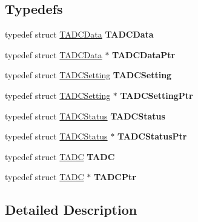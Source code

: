 \subsection*{Typedefs}
\begin{DoxyCompactItemize}
\item 
\hypertarget{group___adc_strc_gaabc053244bce68f5004ad44af7f422ac}{typedef struct \hyperlink{struct_t_a_d_c_data}{T\-A\-D\-C\-Data} {\bfseries T\-A\-D\-C\-Data}}\label{group___adc_strc_gaabc053244bce68f5004ad44af7f422ac}

\item 
\hypertarget{group___adc_strc_gad9248d597a7e144380114ef0dbe20cc5}{typedef struct \hyperlink{struct_t_a_d_c_data}{T\-A\-D\-C\-Data} $\ast$ {\bfseries T\-A\-D\-C\-Data\-Ptr}}\label{group___adc_strc_gad9248d597a7e144380114ef0dbe20cc5}

\item 
\hypertarget{group___adc_strc_gae4f02bb2c9f53335a8ca370614f74524}{typedef struct \hyperlink{struct_t_a_d_c_setting}{T\-A\-D\-C\-Setting} {\bfseries T\-A\-D\-C\-Setting}}\label{group___adc_strc_gae4f02bb2c9f53335a8ca370614f74524}

\item 
\hypertarget{group___adc_strc_ga793ae314045584a7b66afcbb2f41480e}{typedef struct \hyperlink{struct_t_a_d_c_setting}{T\-A\-D\-C\-Setting} $\ast$ {\bfseries T\-A\-D\-C\-Setting\-Ptr}}\label{group___adc_strc_ga793ae314045584a7b66afcbb2f41480e}

\item 
\hypertarget{group___adc_strc_ga1e365637ba4e56bc1cb6823d6a564e99}{typedef struct \hyperlink{struct_t_a_d_c_status}{T\-A\-D\-C\-Status} {\bfseries T\-A\-D\-C\-Status}}\label{group___adc_strc_ga1e365637ba4e56bc1cb6823d6a564e99}

\item 
\hypertarget{group___adc_strc_ga63160c4fe11be4e3f32133672b9b9c4e}{typedef struct \hyperlink{struct_t_a_d_c_status}{T\-A\-D\-C\-Status} $\ast$ {\bfseries T\-A\-D\-C\-Status\-Ptr}}\label{group___adc_strc_ga63160c4fe11be4e3f32133672b9b9c4e}

\item 
\hypertarget{group___adc_strc_ga28e28b6703a05705bfd982018c266202}{typedef struct \hyperlink{struct_t_a_d_c}{T\-A\-D\-C} {\bfseries T\-A\-D\-C}}\label{group___adc_strc_ga28e28b6703a05705bfd982018c266202}

\item 
\hypertarget{group___adc_strc_gad921585602c286cb55cb67a1c08772d9}{typedef struct \hyperlink{struct_t_a_d_c}{T\-A\-D\-C} $\ast$ {\bfseries T\-A\-D\-C\-Ptr}}\label{group___adc_strc_gad921585602c286cb55cb67a1c08772d9}

\end{DoxyCompactItemize}


\subsection{Detailed Description}
